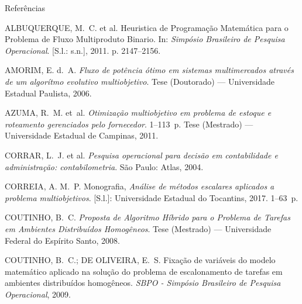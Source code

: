 \documentclass[]{beamer}
\begin{document}
\begin{frame}[allowframebreaks]{Referências}
	\begin{thebibliography}{9}
		\providecommand{\abntrefinfo}[3]{}
		\providecommand{\abntbstabout}[1]{}
		\abntbstabout{v-1.9.6 }
		
		\abntrefinfo{ALBUQUERQUE, SANTOS e FILHO}{ALBUQUERQUE; SANTOS; FILHO}{2011}
		{ALBUQUERQUE, M.~C. et al. {Heuristica de Programa{\c{c}}{\~{a}}o
		  Matem{\'{a}}tica para o Problema de Fluxo Multiproduto Binario}. In:
		  \emph{Simp{\'{o}}sio Brasileiro de Pesquisa Operacional}. [S.l.: s.n.], 2011.
		  p. 2147--2156.}
		
		\abntrefinfo{AMORIM}{AMORIM}{2006}
		{AMORIM, E. d.~A.
		\emph{{Fluxo de pot{\^{e}}ncia {\'{o}}timo em sistemas multimercados
		  atrav{\'{e}}s de um algor{\'{i}}tmo evolutivo multiobjetivo}}.
		Tese (Doutorado) --- Universidade Estadual Paulista, 2006.}
		
		\abntrefinfo{AZUMA}{AZUMA}{2011}
		{AZUMA, R.~M. et~al.
		\emph{{Otimiza{\c{c}}{\~{a}}o multiobjetivo em problema de estoque e roteamento
		  gerenciados pelo fornecedor}}.
		1--113~p. Tese (Mestrado) --- Universidade Estadual de Campinas, 2011.}
		
		\abntrefinfo{CORRAR, THE{\'{O}}PHILO e BERGMANN}{CORRAR; THE{\'{O}}PHILO;
		  BERGMANN}{2004}
		{CORRAR, L.~J. et al. \emph{{Pesquisa operacional para decis{\~{a}}o em
		  contabilidade e administra{\c{c}}{\~{a}}o: contabilometria}}. S{\~{a}}o
		  Paulo: Atlas, 2004.}
		
		\abntrefinfo{CORREIA}{CORREIA}{2017}
		{CORREIA, A. M.~P.
		Monografia, \emph{{An{\'{a}}lise de m{\'{e}}todos escalares aplicados a
		  problema multiobjetivos}}. [S.l.]: Universidade Estadual do Tocantins, 2017.
		  1--63~p.}
		
		\abntrefinfo{COUTINHO}{COUTINHO}{2008}
		{COUTINHO, B.~C.
		\emph{{Proposta de Algoritmo H{\'{i}}brido para o Problema de Tarefas em
		  Ambientes Distribu{\'{i}}dos Homog{\^{e}}neos}}.
		Tese (Mestrado) --- Universidade Federal do Esp{\'{i}}rito Santo, 2008.}
		
		\abntrefinfo{COUTINHO e {DE OLIVEIRA}}{COUTINHO; {DE OLIVEIRA}}{2009}
		{COUTINHO, B.~C.; {DE OLIVEIRA}, E.~S. {Fixa{\c{c}}{\~{a}}o de vari{\'{a}}veis
		  do modelo matem{\'{a}}tico aplicado na solu{\c{c}}{\~{a}}o do problema de
		  escalonamento de tarefas em ambientes distribu{\'{i}}dos homog{\^{e}}neos}.
		\emph{SBPO - Simp{\'{o}}sio Brasileiro de Pesquisa Operacional}, 2009.}
		

\end{thebibliography}
\end{frame}
\end{document}
